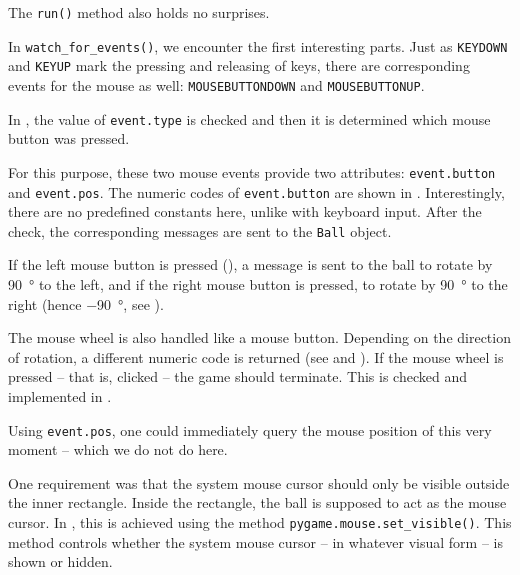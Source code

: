 The \texttt{run()} method also holds no surprises.


In \texttt{watch\_for\_events()}, we encounter the first interesting parts. Just as \texttt{KEYDOWN} and \texttt{KEYUP} mark the pressing and releasing of keys, there are corresponding events for the mouse as well:  \texttt{MOUSEBUTTONDOWN} and \texttt{MOUSEBUTTONUP}.  

In , the value of \texttt{event.type} is checked and then it is determined which mouse button was pressed.

For this purpose, these two mouse events provide two attributes: \texttt{event.button} and \texttt{event.pos}. The numeric codes of \texttt{event.button} are shown in . Interestingly, there are no predefined constants here, unlike with keyboard input. After the check, the corresponding messages are sent to the \texttt{Ball} object.

If the left mouse button is pressed (), a message is sent to the ball to rotate by  \SI{90}{\degree} to the left, and if the right mouse button is pressed, to rotate by \SI{90}{\degree} to the right (hence  \SI{-90}{\degree}, see ).  

The mouse wheel is also handled like a mouse button. Depending on the direction of rotation, a different numeric code is returned (see  and ). If the mouse wheel is pressed -- that is, clicked -- the game should terminate. This is checked and implemented in .

Using \texttt{event.pos}, one could immediately query the mouse position of this very moment -- which we do not do here.


One requirement was that the system mouse cursor should only be visible outside the inner rectangle. Inside the rectangle, the ball is supposed to act as the mouse cursor. In , this is achieved using the method \texttt{pygame.mouse.set\_visible()}. This method controls whether the system mouse cursor -- in whatever visual form -- is shown or hidden.

